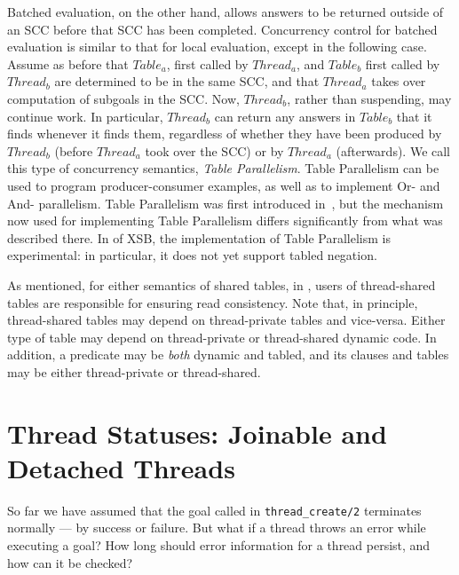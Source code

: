 Batched evaluation, on the other hand, allows answers to be returned
outside of an SCC before that SCC has been completed.  Concurrency
control for batched evaluation is similar to that for local
evaluation, except in the following case.  Assume as before that
$Table_a$, first called by $Thread_a$, and $Table_b$ first called by
$Thread_b$ are determined to be in the same SCC, and that $Thread_a$
takes over computation of subgoals in the SCC.  Now, $Thread_b$,
rather than suspending, may continue work.  In particular, $Thread_b$
can return any answers in $Table_b$ that it finds whenever it finds
them, regardless of whether they have been produced by $Thread_b$
(before $Thread_a$ took over the SCC) or by $Thread_a$ (afterwards).
We call this type of concurrency semantics, {\em Table Parallelism}.
Table Parallelism can be used to program producer-consumer examples,
as well as to implement Or- and And- parallelism.  Table Parallelism
was first introduced in~\cite{FHSW95}, but the mechanism now used for
implementing Table Parallelism differs significantly from what was
described there.  In \version{} of XSB, the implementation of Table
Parallelism is experimental: in particular, it does not yet support
tabled negation.

As mentioned, for either semantics of shared tables, in \version{},
users of thread-shared tables are responsible for ensuring read
consistency.  Note that, in principle, thread-shared tables may depend
on thread-private tables and vice-versa.  Either type of table may
depend on thread-private or thread-shared dynamic code.  In addition,
a predicate may be {\em both} dynamic and tabled, and its clauses and
tables may be either thread-private or thread-shared.

\section{Thread Statuses: Joinable and Detached Threads} \label{sec:thread-status}

So far we have assumed that the goal called in {\tt thread\_create/2}
terminates normally --- by success or failure.  But what if a thread
throws an error while executing a goal?  How long should error
information for a thread persist, and how can it be checked?


